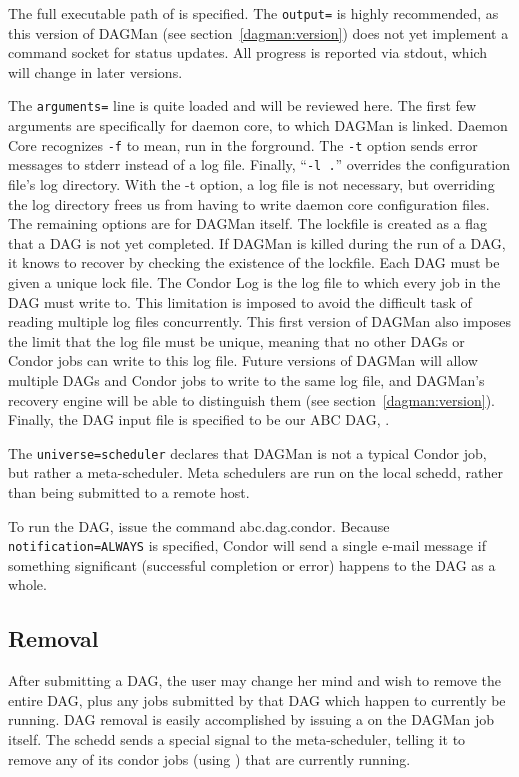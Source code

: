 The full executable path of  is specified.  The
\texttt{output=} is highly recommended, as this version of DAGMan (see
section~\ref{dagman:version}) does not yet implement a command socket for
status updates.  All progress is reported via stdout, which will change in
later versions.

The \texttt{arguments=} line is quite loaded and will be reviewed here.  The
first few arguments are specifically for daemon core, to which DAGMan is
linked.  Daemon Core recognizes \texttt{-f} to mean, run in the forground.
The \texttt{-t} option sends error messages to stderr instead of a log file.
Finally, ``\texttt{-l .}'' overrides the configuration file's log directory.
With the -t option, a log file is not necessary, but overriding the log
directory frees us from having to write daemon core configuration files.  The
remaining options are for DAGMan itself.  The lockfile is created as a flag
that a DAG is not yet completed.  If DAGMan is killed during the run of a DAG,
it knows to recover by checking the existence of the lockfile.  Each DAG must
be given a unique lock file.  The Condor Log is the log file to which every
job in the DAG must write to.  This limitation is imposed to avoid the
difficult task of reading multiple log files concurrently.  This first version
of DAGMan also imposes the limit that the log file must be unique, meaning
that no other DAGs or Condor jobs can write to this log file.  Future versions
of DAGMan will allow multiple DAGs and Condor jobs to write to the same log
file, and DAGMan's recovery engine will be able to distinguish them (see
section~\ref{dagman:version}).  Finally, the DAG input file is specified to be
our ABC DAG, .

The \texttt{universe=scheduler} declares that DAGMan is not a typical Condor
job, but rather a meta-scheduler.  Meta schedulers are run on the local
schedd, rather than being submitted to a remote host.

To run the DAG, issue the command  abc.dag.condor.  Because
\texttt{notification=ALWAYS} is specified, Condor will send a single e-mail
message if something significant (successful completion or error) happens to
the DAG as a whole.

\subsection{Removal}

After submitting a DAG, the user may change her mind and wish to remove the
entire DAG, plus any jobs submitted by that DAG which happen to currently be
running.  DAG removal is easily accomplished by issuing a  on the
DAGMan job itself.  The schedd sends a special signal to the meta-scheduler,
telling it to remove any of its condor jobs (using ) that are
currently running.

